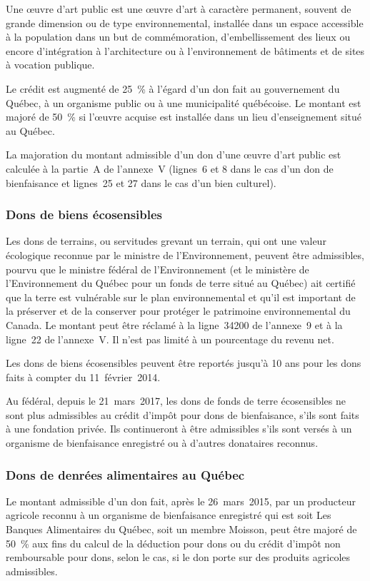 Une \og œuvre d'art public \fg{} est une œuvre d'art à caractère permanent, souvent de grande dimension ou de type environnemental, installée dans un espace accessible à la population dans un but de commémoration, d'embellissement des lieux ou encore d'intégration à l'architecture ou à l'environnement de bâtiments et de sites à vocation publique.

Le crédit est augmenté de 25~\% à l'égard d'un don fait au gouvernement du Québec, à un organisme public ou à une municipalité québécoise. Le montant est majoré de 50~\% si l'œuvre acquise est installée dans un lieu d'enseignement situé au Québec.

La majoration du montant admissible d'un don d'une œuvre d'art public est calculée à la partie~A de l'annexe~V (lignes~6 et 8 dans le cas d'un don de bienfaisance et lignes~25 et 27 dans le cas d'un bien culturel).

\subsubsection{Dons de biens écosensibles}
Les dons de terrains, ou servitudes grevant un terrain, qui ont une valeur écologique reconnue par le ministre de l'Environnement, peuvent être admissibles, pourvu que le ministre fédéral de l'Environnement (et le ministère de l'Environnement du Québec pour un fonds de terre situé au Québec) ait certifié que la terre est vulnérable sur le plan environnemental et qu'il est important de la préserver et de la conserver pour protéger le patrimoine environnemental du Canada. Le montant peut être réclamé à la ligne~34200 de l'annexe~9 et à la ligne~22 de l'annexe~V. Il n'est pas limité à un pourcentage du revenu net.

Les dons de biens écosensibles peuvent être reportés jusqu'à 10 ans pour les dons faits à compter du 11~février~2014.

Au fédéral, depuis le 21~mars~2017, les dons de fonds de terre écosensibles ne sont plus admissibles au crédit d'impôt pour dons de bienfaisance, s'ils sont faits à une fondation privée. Ils continueront à être admissibles s'ils sont versés à un organisme de bienfaisance enregistré ou à d'autres donataires reconnus.

\subsubsection{Dons de denrées alimentaires au Québec}
Le montant admissible d'un don fait, après le 26~mars~2015, par un producteur agricole reconnu à un organisme de bienfaisance enregistré qui est soit Les Banques Alimentaires du Québec, soit un membre Moisson, peut être majoré de 50~\% aux fins du calcul de la déduction pour dons ou du crédit d'impôt non remboursable pour dons, selon le cas, si le don porte sur des produits agricoles admissibles.

